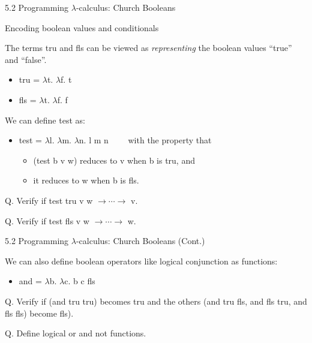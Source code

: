 \documentclass[table]{beamer}
\begin{document}
\begin{frame}[t]{5.2 Programming $\lambda$-calculus: Church Booleans} 

Encoding boolean values and conditionals 

\vspace{10pt}

The terms tru and fls can be viewed as {\it representing} the boolean values ``true'' and ``false''.
\begin{itemize}
\item tru = $\lambda$t. $\lambda$f. t
\item fls = $\lambda$t. $\lambda$f. f 
\end{itemize}

\vspace{5pt}

We can define test as:
\begin{itemize}
\item test = $\lambda$l. $\lambda$m. $\lambda$n. l m n \ \ \ \ with the property that 
\begin{itemize} 
\item[(1)] (test b v w) reduces to v when b is tru, and 
\item[(2)] it reduces to w when b is fls. 
\end{itemize}
\end{itemize}

\vspace{10pt}

Q. Verify if test tru v w $\rightarrow \cdots \rightarrow$ v.

\vspace{5pt}

Q. Verify if test fls v w $\rightarrow \cdots \rightarrow$ w.

\end{frame}

\begin{frame}[t]{5.2 Programming $\lambda$-calculus: Church Booleans (Cont.)} \vspace{10pt}

We can also define boolean operators like logical conjunction as functions: 
\begin{itemize}
\item and = $\lambda$b. $\lambda$c. b c fls
\end{itemize}

\vspace{10pt}

Q. Verify if (and tru tru) becomes tru and the others (and tru fls, and fls tru, and fls fls) become fls).

\vspace{10pt}

Q. Define logical or and not functions.

\end{frame}
\end{document}
